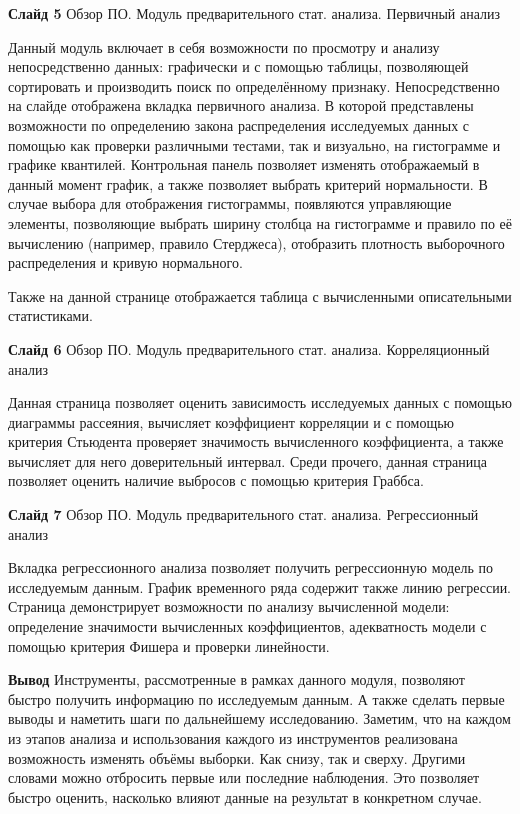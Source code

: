 \documentclass[a4paper,10pt]{report}
\begin{document}
\textbf{Слайд 5} Обзор ПО. Модуль предварительного стат. анализа. Первичный анализ

Данный модуль включает в себя возможности по просмотру и анализу непосредственно данных: графически и с помощью таблицы, позволяющей сортировать и производить поиск по определённому признаку. Непосредственно на слайде отображена вкладка первичного анализа. В которой представлены возможности по определению закона распределения исследуемых данных с помощью как проверки различными тестами, так и визуально, на гистограмме и графике квантилей. Контрольная панель позволяет изменять отображаемый в данный момент график, а также позволяет выбрать критерий нормальности. В случае выбора для отображения гистограммы, появляются управляющие элементы, позволяющие выбрать ширину столбца на гистограмме и правило по её вычислению (например, правило Стерджеса), отобразить плотность выборочного распределения и кривую нормального.

Также на данной странице отображается таблица с вычисленными описательными статистиками.

\textbf{Слайд 6} Обзор ПО. Модуль предварительного стат. анализа. Корреляционный анализ

Данная страница позволяет оценить зависимость исследуемых данных с помощью диаграммы рассеяния, вычисляет коэффициент корреляции и с помощью критерия Стьюдента проверяет значимость вычисленного коэффициента, а также вычисляет для него доверительный интервал. Среди прочего, данная страница позволяет оценить наличие выбросов с помощью критерия Граббса.

\textbf{Слайд 7} Обзор ПО. Модуль предварительного стат. анализа. Регрессионный анализ

Вкладка регрессионного анализа позволяет получить регрессионную модель по исследуемым данным. График временного ряда содержит также линию регрессии. Страница демонстрирует возможности по анализу вычисленной модели: определение значимости вычисленных коэффициентов, адекватность модели с помощью критерия Фишера и проверки линейности.

\textbf{Вывод} Инструменты, рассмотренные в рамках данного модуля, позволяют быстро получить информацию по исследуемым данным. А также сделать первые выводы и наметить шаги по дальнейшему исследованию. Заметим, что на каждом из этапов анализа и использования каждого из инструментов реализована возможность изменять объёмы выборки. Как снизу, так и сверху. Другими словами можно отбросить первые или последние наблюдения. Это позволяет быстро оценить, насколько влияют данные на результат в конкретном случае.
\end{document}
